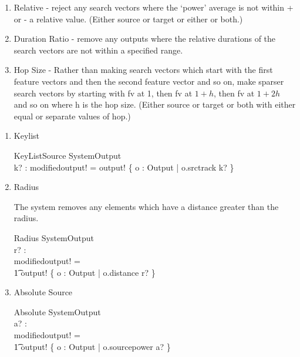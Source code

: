 \documentclass[11pt]{article}
\begin{document}
\begin{enumerate}
\begin{enumerate}
\item \textsf{Relative} - reject any search vectors where the `power' average  is not within  + or  - a relative value.  (Either source or target or either or both.) 

\item \textsf{Duration Ratio} - remove any outputs where the relative durations of the search vectors are not within a specified range. 

\item \textsf{Hop Size} - Rather than making search vectors which start with the first feature vectors and then the second feature vector and so on, make sparser search vectors by starting with fv at 1, then fv at $1 + h$, then fv at $1 + 2h$ and so on where h is the hop size. (Either source or target or both with either equal or separate values of hop.) 

\end{enumerate}

\begin{enumerate}

\item Keylist

\begin{schema}{KeyListSource}
	SystemOutput \\
	k? : \power \nat 
\where
	modifiedoutput! = output! \filter \{ o : Output |  o.srctrack \in k? \} 
\end{schema}	

\item Radius
	
The system removes any elements which have a distance greater than the radius.

\begin{schema}{Radius}
	SystemOutput \\
	r? : \R \\
\where
	modifiedoutput! = \\ 
	\t1 output! \filter \{ o : Output | o.distance \leq r? \}
\end{schema}

\item Absolute Source

\begin{schema}{Absolute}
	SystemOutput \\
	a? : \R \\
\where
	modifiedoutput! = \\
	\t1 output! \filter \{ o : Output | o.sourcepower \geq  a? \} 
\end{schema}	
	

\end{enumerate}
\end{enumerate}
\end{document}
